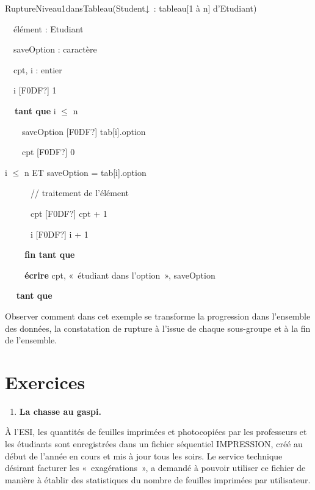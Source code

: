 {\sffamily
{} RuptureNiveau1dansTableau(Student↓~: tableau[1 à
n] d’Etudiant)}

{\sffamily
{}}

{\sffamily
\ \ élément : Etudiant}

{\sffamily
\ \ saveOption : caractère}

{\sffamily
\ \ cpt, i : entier}

{\sffamily
\ \ i \textrm{[F0DF?]} 1}

{\sffamily
\textbf{\ \ tant que} i ${\leq}$ n \ \ }

{\sffamily
\ \ \ \ saveOption \textrm{[F0DF?]} tab[i].option\ \ \ \ }

{\sffamily
\ \ \ \ cpt \textrm{[F0DF?]} 0}

{\sffamily
{}  i ${\leq}$ n ET
saveOption = tab[i].option \ \ }

{\sffamily
\ \ \ \ \ \ // traitement de l’élément}

{\sffamily
\ \ \ \ \ \ cpt \textrm{[F0DF?]} cpt + 1}

{\sffamily
\ \ \ \ \ \ {i
}\textrm{[F0DF?]}{ i + 1}}

{\sffamily
{\textbf{\ \ \ \ }}\textbf{fin tant que}}

{\sffamily
\textbf{\ \ \ \ écrire} cpt, «~étudiant dans l’option~», saveOption}

{\sffamily
\ \  \textbf{tant que} }

{\sffamily
{} }

{
Observer comment dans cet exemple se transforme la progression dans
l’ensemble des données, la constatation de rupture à l’issue de chaque
sous-groupe et à la fin de l’ensemble.}

\section{Exercices}

\bigskip

\liststyleExercice
\begin{enumerate}
\item {\sffamily\bfseries
La chasse au gaspi.}
\end{enumerate}
{
À l’ESI, les quantités de feuilles imprimées et photocopiées par les
professeurs et les étudiants sont enregistrées dans un fichier
séquentiel IMPRESSION, créé au début de l’année en cours et mis à jour
tous les soirs. Le service technique désirant facturer les
«~exagérations~», a demandé à pouvoir utiliser ce fichier de manière à
établir des statistiques du nombre de feuilles imprimées par
utilisateur.}

